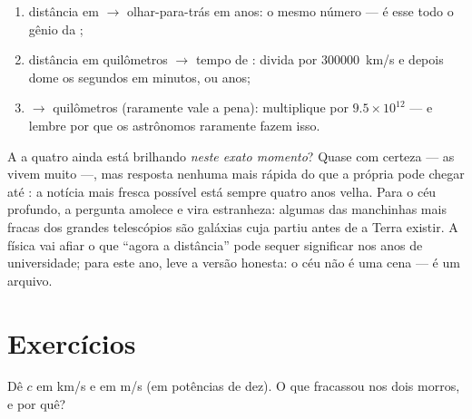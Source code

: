 \begin{method}\label{met:g8:speed-of-light:convert}
\begin{enumerate}
  \item distância em  $\to$ olhar-para-trás em anos: o mesmo
        número --- é esse todo o gênio da ;
  \item distância em quilômetros $\to$ tempo de : divida por
        \qty{300000}{km/s} e depois dome os segundos em minutos,
         ou anos;
  \item {} $\to$ quilômetros (raramente vale a pena):
        multiplique por $9.5 \times 10^{12}$ --- e lembre por que os
        astrônomos raramente fazem isso.
\end{enumerate}
\end{method}

\begin{remark}\label{rem:g8:speed-of-light:now}
A  a quatro  ainda está brilhando \emph{neste exato
momento}? Quase com certeza --- as  vivem muito ---, mas
resposta nenhuma mais rápida do que a própria  pode chegar até
: a notícia mais fresca possível está sempre quatro anos velha.
Para o céu profundo, a pergunta amolece e vira estranheza: algumas
das manchinhas mais fracas dos grandes telescópios são galáxias cuja
 partiu antes de a Terra existir. A física vai afiar o que ``agora
a distância'' pode sequer significar nos anos de universidade; para
este ano, leve a versão honesta: o céu não é uma cena --- é um
arquivo.
\end{remark}

\section{Exercícios}

\begin{exercise}[$\star$]\label{exo:g8:speed-of-light:1}
Dê $c$ em \unit{km/s} e em \unit{m/s} (em potências de dez). O que
fracassou nos dois morros, e por quê?
\end{exercise}

